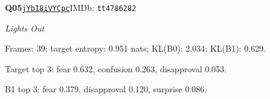 \par\noindent\begin{minipage}{\textwidth}\small
\textbf{Q05}\quad\href{https://www.youtube.com/watch?v=jYbI8iVYCpc}{\texttt{jYbI8iVYCpc}}\quad IMDb: \texttt{tt4786282}\par
\textit{Lights Out}\par
Frames: 39; target entropy: 0.951 nats; KL(B0): 2.034; KL(B1): 0.629.\par
Target top 3: fear 0.632, confusion 0.263, disapproval 0.053.\par
B1 top 3: fear 0.379, disapproval 0.120, surprise 0.086.\par
\end{minipage}\par\medskip
